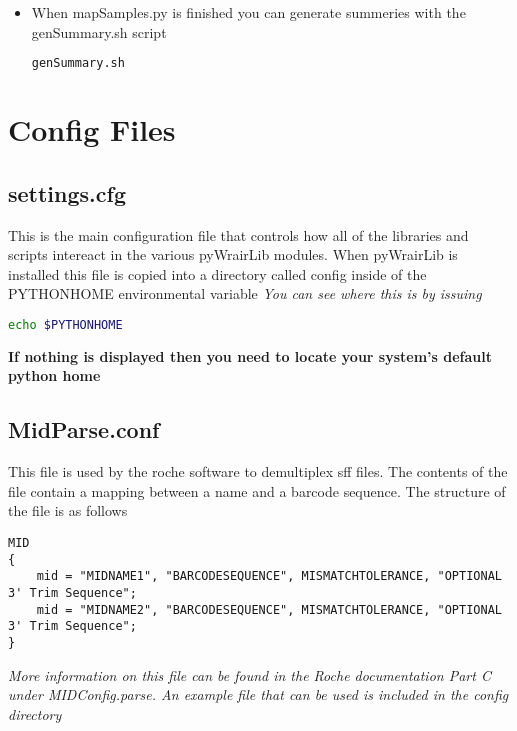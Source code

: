 \documentclass{article}
\begin{document}
\begin{itemize}
  \begin{itemize}
   \item Be patient if there are a lot of samples to map.
  \end{itemize}
{\tiny
\begin{lstlisting}[language=bash]
cd myanalysis
mapSamples.py workfile/Runfile.txt
\end{lstlisting}
}
\item When mapSamples.py is finished you can generate summeries with the genSummary.sh script
{\tiny
\begin{lstlisting}[language=bash]
genSummary.sh
\end{lstlisting}
}
\end{itemize}


\section{Config Files}
 \subsection{settings.cfg}
This is the main configuration file that controls how all of the libraries and scripts intereact in the various pyWrairLib modules.
When pyWrairLib is installed this file is copied into a directory called config inside of the PYTHONHOME environmental variable
\textit{You can see where this is by issuing}
\begin{lstlisting}[language=bash]
echo $PYTHONHOME
\end{lstlisting}
\textbf{If nothing is displayed then you need to locate your system's default python home}

\subsection{MidParse.conf}
This file is used by the roche software to demultiplex sff files. The contents of the file contain a mapping
between a name and a barcode sequence.
The structure of the file is as follows
\begin{lstlisting}
MID
{
    mid = "MIDNAME1", "BARCODESEQUENCE", MISMATCHTOLERANCE, "OPTIONAL 3' Trim Sequence";
    mid = "MIDNAME2", "BARCODESEQUENCE", MISMATCHTOLERANCE, "OPTIONAL 3' Trim Sequence";
}
\end{lstlisting}

{\em More information on this file can be found in the Roche documentation Part C under MIDConfig.parse. An example file that can be used is included in the config directory}
\end{document}
